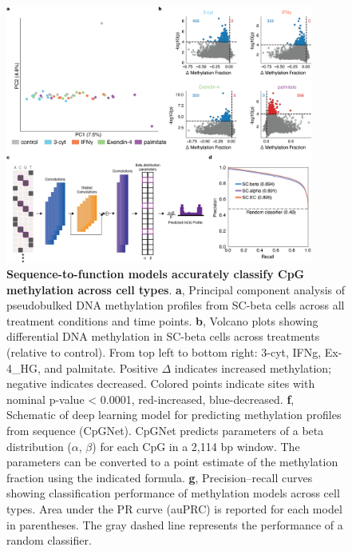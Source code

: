 \begin{figure}[p]
    \centering
    \includegraphics[width=0.9\textwidth, height=0.745\textheight]{3_figures-and-files/Fig5.png}
    \caption[CpG methylation prediction across cell types]{\textbf{Sequence-to-function models accurately classify CpG methylation across cell types}. \textbf{a}, Principal component analysis of pseudobulked DNA methylation profiles from SC-beta cells across all treatment conditions and time points. \textbf{b}, Volcano plots showing differential DNA methylation in SC-beta cells across treatments (relative to control). From top left to bottom right: 3-cyt, IFNg, Ex-4\_HG, and palmitate. Positive $\Delta$ indicates increased methylation; negative indicates decreased. Colored points indicate sites with nominal p-value < 0.0001, red-increased, blue-decreased. \textbf{f}, Schematic of deep learning model for predicting methylation profiles from sequence (CpGNet). CpGNet predicts parameters of a beta distribution ($\alpha$, $\beta$) for each CpG in a 2,114 bp window. The parameters can be converted to a point estimate of the methylation fraction using the indicated formula. \textbf{g}, Precision–recall curves showing classification performance of methylation models across cell types. Area under the PR curve (auPRC) is reported for each model in parentheses. The gray dashed line represents the performance of a random classifier.}
    \label{fig:3 Figure 5}
\end{figure}

